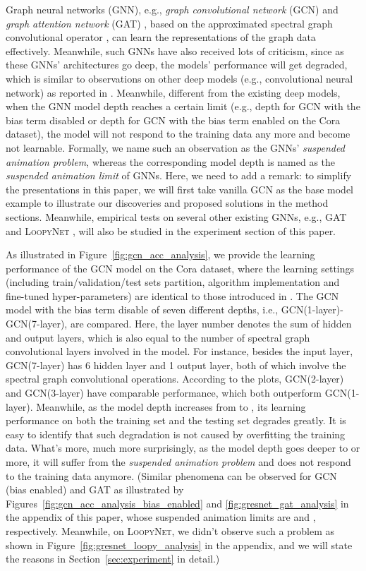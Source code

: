 \documentclass{article}
\newcommand{\gcn}{\textsc{GCN}}
\newcommand{\gat}{\textsc{GAT}}
\newcommand{\loopy}{\textsc{LoopyNet}}
\begin{document}
Graph neural networks (GNN), e.g., \textit{graph convolutional network} ({\gcn}) \cite{KW16} and \textit{graph attention network} ({\gat}) \cite{PGAAPY18}, based on the approximated spectral graph convolutional operator \cite{HVG11}, can learn the representations of the graph data effectively. Meanwhile, such GNNs have also received lots of criticism, since as these GNNs' architectures go deep, the models' performance will get degraded, which is similar to observations on other deep models (e.g., convolutional neural network) as reported in \cite{HZRS15}. Meanwhile, different from the existing deep models, when the GNN model depth reaches a certain limit (e.g., depth  for {\gcn} with the bias term disabled or depth  for {\gcn} with the bias term enabled on the Cora dataset), the model will not respond to the training data any more and become not learnable. Formally, we name such an observation as the GNNs' \textit{suspended animation problem}, whereas the corresponding model depth is named as the \textit{suspended animation limit} of GNNs. Here, we need to add a remark: to simplify the presentations in this paper, we will first take vanilla {\gcn} as the base model example to illustrate our discoveries and proposed solutions in the method sections. Meanwhile, empirical tests on several other existing GNNs, e.g., {\gat} \cite{PGAAPY18} and {\loopy} \cite{difnet}, will also be studied in the experiment section of this paper.

As illustrated in Figure~\ref{fig:gcn_acc_analysis}, we provide the learning performance of the {\gcn} model on the Cora dataset, where the learning settings (including train/validation/test sets partition, algorithm implementation and fine-tuned hyper-parameters) are identical to those introduced in \cite{KW16}. The {\gcn} model with the bias term disable of seven different depths, i.e., {\gcn}(1-layer)-{\gcn}(7-layer), are compared. Here, the layer number denotes the sum of hidden and output layers, which is also equal to the number of spectral graph convolutional layers involved in the model. For instance, besides the input layer, {\gcn}(7-layer) has 6 hidden layer and 1 output layer, both of which involve the spectral graph convolutional operations. According to the plots, {\gcn}(2-layer) and {\gcn}(3-layer) have comparable performance, which both outperform {\gcn}(1-layer). Meanwhile, as the model depth increases from  to , its learning performance on both the training set and the testing set degrades greatly. It is easy to identify that such degradation is not caused by overfitting the training data. What's more, much more surprisingly, as the model depth goes deeper to  or more, it will suffer from the \textit{suspended animation problem} and does not respond to the training data anymore. (Similar phenomena can be observed for {\gcn} (bias enabled) and {\gat} as illustrated by Figures~\ref{fig:gcn_acc_analysis_bias_enabled} and \ref{fig:gresnet_gat_analysis} in the appendix of this paper, whose suspended animation limits are  and , respectively. Meanwhile, on {\loopy}, we didn't observe such a problem as shown in Figure~\ref{fig:gresnet_loopy_analysis} in the appendix, and we will state the reasons in Section~\ref{sec:experiment} in detail.)
\end{document}

